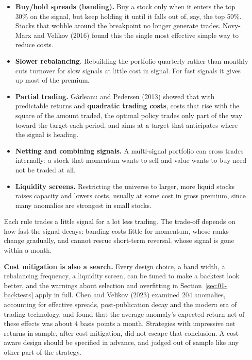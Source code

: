 \begin{itemize}
  \item \textbf{Buy/hold spreads (banding).} Buy a stock only when it enters the top 30\% on the signal, but keep holding it until it falls out of, say, the top 50\%. Stocks that wobble around the breakpoint no longer generate trades. Novy-Marx and Velikov (2016) found this the single most effective simple way to reduce costs.
  \item \textbf{Slower rebalancing.} Rebuilding the portfolio quarterly rather than monthly cuts turnover for slow signals at little cost in signal. For fast signals it gives up most of the premium.
  \item \textbf{Partial trading.} G\^arleanu and Pedersen (2013) showed that with predictable returns and \textbf{quadratic trading costs}, costs that rise with the square of the amount traded, the optimal policy trades only part of the way toward the target each period, and aims at a target that anticipates where the signal is heading.
  \item \textbf{Netting and combining signals.} A multi-signal portfolio can cross trades internally: a stock that momentum wants to sell and value wants to buy need not be traded at all.
  \item \textbf{Liquidity screens.} Restricting the universe to larger, more liquid stocks raises capacity and lowers costs, usually at some cost in gross premium, since many anomalies are strongest in small stocks.
\end{itemize}

Each rule trades a little signal for a lot less trading. The trade-off depends on how fast the signal decays: banding costs little for momentum, whose ranks change gradually, and cannot rescue short-term reversal, whose signal is gone within a month.

\textbf{Cost mitigation is also a search.} Every design choice, a band width, a rebalancing frequency, a liquidity screen, can be tuned to make a backtest look better, and the warnings about selection and overfitting in Section~\ref{sec:01-backtests} apply in full. Chen and Velikov (2023) examined 204 anomalies, accounting for effective spreads, post-publication decay and the modern era of trading technology, and found that the average anomaly's expected return net of these effects was about 4 basis points a month. Strategies with impressive net returns in-sample, after cost mitigation, did not escape that conclusion. A cost-aware design should be specified in advance, and judged out of sample like any other part of the strategy.

